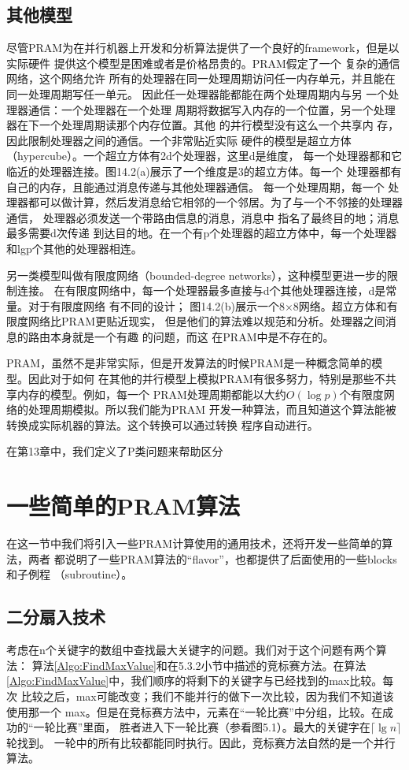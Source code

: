 \subsection{其他模型}
尽管PRAM为在并行机器上开发和分析算法提供了一个良好的framework，但是以实际硬件
提供这个模型是困难或者是价格昂贵的。PRAM假定了一个 复杂的通信网络，这个网络允许
所有的处理器在同一处理周期访问任一内存单元，并且能在同一处理周期写任一单元。
因此任一处理器能都能在两个处理周期内与另 一个处理器通信：一个处理器在一个处理
周期将数据写入内存的一个位置，另一个处理器在下一个处理周期读那个内存位置。其他
的并行模型没有这么一个共享内 存，因此限制处理器之间的通信。一个非常贴近实际
硬件的模型是超立方体（hypercube）。一个超立方体有2d个处理器，这里d是维度，
每一个处理器都和它临近的处理器连接。图14.2(a)展示了一个维度是3的超立方体。每一个
处理器都有自己的内存，且能通过消息传递与其他处理器通信。 每一个处理周期，每一个
处理器都可以做计算，然后发消息给它相邻的一个邻居。为了与一个不邻接的处理器通信，
处理器必须发送一个带路由信息的消息，消息中 指名了最终目的地；消息最多需要d次传递
到达目的地。在一个有p个处理器的超立方体中，每一个处理器和lgp个其他的处理器相连。

另一类模型叫做有限度网络（bounded-degree networks），这种模型更进一步的限制连接。
在有限度网络中，每一个处理器最多直接与d个其他处理器连接，d是常量。对于有限度网络
有不同的设计； 图14.2(b)展示一个8×8网络。超立方体和有限度网络比PRAM更贴近现实，
但是他们的算法难以规范和分析。处理器之间消息的路由本身就是一个有趣 的问题，而这
在PRAM中是不存在的。

PRAM，虽然不是非常实际，但是开发算法的时候PRAM是一种概念简单的模型。因此对于如何
在其他的并行模型上模拟PRAM有很多努力，特别是那些不共享内存的模型。例如，每一个
PRAM处理周期都能以大约$O(\log p)$个有限度网络的处理周期模拟。所以我们能为PRAM
开发一种算法，而且知道这个算法能被转换成实际机器的算法。这个转换可以通过转换
程序自动进行。

在第13章中，我们定义了P类问题来帮助区分


\section{一些简单的PRAM算法}
在这一节中我们将引入一些PRAM计算使用的通用技术，还将开发一些简单的算法，两者
都说明了一些PRAM算法的“flavor”，也都提供了后面使用的一些blocks和子例程
（subroutine）。
\subsection{二分扇入技术}
考虑在n个关键字的数组中查找最大关键字的问题。我们对于这个问题有两个算法：
算法\ref{Algo:FindMaxValue}和在5.3.2小节中描述的竞标赛方法。在算法
\ref{Algo:FindMaxValue}中，我们顺序的将剩下的关键字与已经找到的max比较。每次
比较之后，max可能改变；我们不能并行的做下一次比较，因为我们不知道该使用那一个
max。但是在竞标赛方法中，元素在“一轮比赛”中分组，比较。在成功的“一轮比赛”里面，
胜者进入下一轮比赛（参看图5.1）。最大的关键字在$\lceil \lg n\rceil$轮找到。
一轮中的所有比较都能同时执行。因此，竞标赛方法自然的是一个并行算法。

